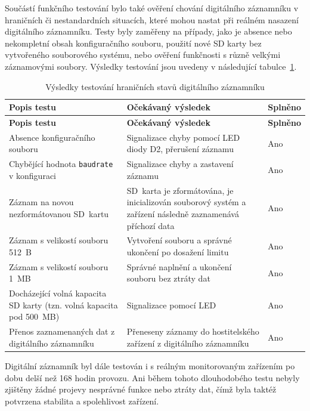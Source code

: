 Součástí funkčního testování bylo také ověření chování digitálního záznamníku v hraničních či nestandardních situacích, které mohou nastat při reálném nasazení digitálního záznamníku. Testy byly zaměřeny na případy, jako je absence nebo nekompletní obsah konfiguračního souboru, použití nové SD karty bez vytvořeného souborového systému, nebo ověření funkčnosti s různě velkými záznamovými soubory. Výsledky testování jsou uvedeny v následující tabulce~\ref{tab:test-extremes}.

\begin{longtable}{|p{6cm}|p{5cm}|p{3cm}|}
    \caption{Výsledky testování hraničních stavů digitálního záznamníku}
    \label{tab:test-extremes} \\
    \hline
    \textbf{Popis testu} & \textbf{Očekávaný výsledek} & \textbf{Splněno} \\
    \hline
    \endfirsthead

    \hline
    \textbf{Popis testu} & \textbf{Očekávaný výsledek} & \textbf{Splněno} \\
    \hline
    \endhead

    \hline
    \endfoot

    \hline
    \endlastfoot

    Absence konfiguračního souboru & Signalizace chyby pomocí LED diody D2, přerušení záznamu & Ano \\
    \hline
    Chybějící hodnota \texttt{baudrate} v konfiguraci & Signalizace chyby a zastavení záznamu & Ano \\
    \hline
    Záznam na novou nezformátovanou SD~kartu & SD~karta je zformátována, je inicializován souborový systém a zařízení následně zaznamenává příchozí data & Ano \\
    \hline
    Záznam s velikostí souboru 512~B & Vytvoření souboru a správné ukončení po dosažení limitu & Ano \\
    \hline
    Záznam s velikostí souboru 1~MB & Správné naplnění a ukončení souboru bez ztráty dat & Ano \\
    \hline
    Docházející volná kapacita SD karty (tzn. volná kapacita pod 500~MB) & Signalizace pomocí LED & Ano \\
    \hline
    Přenos zaznamenaných dat z digitálního záznamníku & Přeneseny záznamy do hostitelského zařízení z digitálního záznamníku & Ano \\
    \hline
\end{longtable}

Digitální záznamník byl dále testován i s reálným monitorovaným zařízením po dobu delší než 168 hodin provozu. Ani během tohoto dlouhodobého testu nebyly zjištěny žádné projevy nesprávné funkce nebo ztráty dat, čímž byla taktéž potvrzena stabilita a spolehlivost zařízení.

